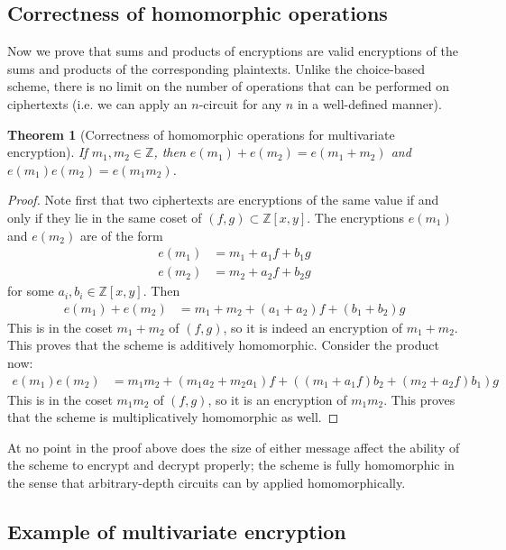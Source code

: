 \documentclass[11pt]{report}
\newtheorem{thm}{Theorem}
\newcommand{\Z}{\mathbb{Z}}
\newcommand{\Zxy}{\mathbb{Z}[x,y]}
\begin{document}
\subsection{Correctness of homomorphic operations}

Now we prove that sums and products of encryptions are valid encryptions of the sums and products of the corresponding plaintexts. Unlike the choice-based scheme, there is no limit on the number of operations that can be performed on ciphertexts (i.e. we can apply an $n$-circuit for any $n$ in a well-defined manner).

\begin{thm}[Correctness of homomorphic operations for multivariate encryption] If $m_1,m_2 \in \Z$, then $e(m_1)+e(m_2) = e(m_1+m_2)$ and $e(m_1)e(m_2) = e(m_1m_2)$.
\end{thm}

\begin{proof}
Note first that two ciphertexts are encryptions of the same value if and only if they lie in the same coset of $(f,g)\subset \Zxy$. The encryptions $e(m_1)$ and $e(m_2)$ are of the form
\begin{align*}
e(m_1) &= m_1+a_1f+b_1g\\
e(m_2) &= m_2+a_2f+b_2g
\end{align*}
for some $a_i,b_i\in \Zxy$. Then
\begin{align*}
e(m_1)+e(m_2) &= m_1+m_2 +(a_1+a_2)f+(b_1+b_2)g
\end{align*}
This is in the coset $m_1+m_2$ of $(f,g)$, so it is indeed an encryption of $m_1+m_2$. This proves that the scheme is additively homomorphic. Consider the product now:
\begin{align*}
e(m_1)e(m_2) &= m_1m_2+(m_1a_2+m_2a_1)f+((m_1+a_1f)b_2+(m_2+a_2f)b_1)g
\end{align*}
This is in the coset $m_1m_2$ of $(f,g)$, so it is an encryption of $m_1m_2$. This proves that the scheme is multiplicatively homomorphic as well.
\end{proof}
At no point in the proof above does the size of either message affect the ability of the scheme to encrypt and decrypt properly; the scheme is fully homomorphic in the sense that arbitrary-depth circuits can by applied homomorphically.


\subsection{Example of multivariate encryption}
\end{document}
